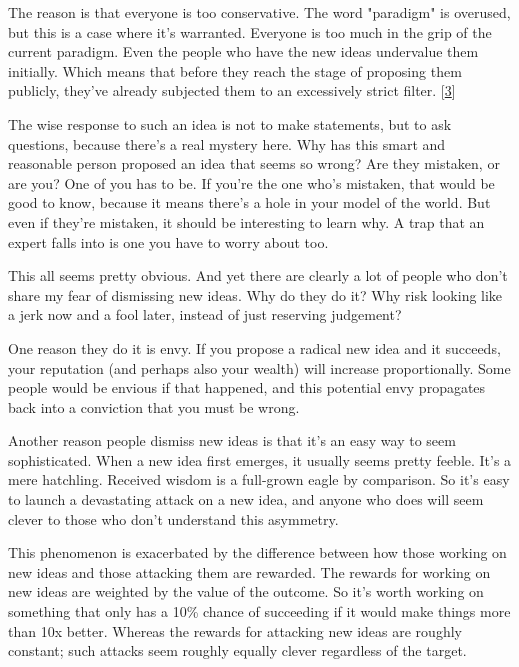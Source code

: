 The reason is that
                  everyone is too conservative. The word "paradigm" is overused,
                  but this is a case where it's warranted. Everyone is too much
                  in the grip of the current paradigm. Even the people who have
                  the new ideas undervalue them initially. Which means that
                  before they reach the stage of proposing them publicly,
                  they've already subjected them to an excessively strict
                  filter.
                  [\href{\#f3n}{3}]

The wise response to such an idea is not to make
                  statements, but to ask questions, because there's a real
                  mystery here. Why has this smart and reasonable person
                  proposed an idea that seems so wrong? Are they mistaken, or
                  are you? One of you has to be. If you're the one who's
                  mistaken, that would be good to know, because it means there's
                  a hole in your model of the world. But even if they're
                  mistaken, it should be interesting to learn why. A trap that
                  an expert falls into is one you have to worry about too.

This
                  all seems pretty obvious. And yet there are clearly a lot of
                  people who don't share my fear of dismissing new ideas. Why do
                  they do it? Why risk looking like a jerk now and a fool later,
                  instead of just reserving judgement?

One reason
                  they do it is envy. If you propose a radical new idea and it
                  succeeds, your reputation (and perhaps also your wealth) will
                  increase proportionally. Some people would be envious if that
                  happened, and this potential envy propagates back into a
                  conviction that you must be wrong.

Another reason
                  people dismiss new ideas is that it's an easy way to seem
                  sophisticated. When a new idea first emerges, it usually seems
                  pretty feeble. It's a mere hatchling. Received wisdom is a
                  full-grown eagle by comparison. So it's easy to launch a
                  devastating attack on a new idea, and anyone who does will
                  seem clever to those who don't understand this asymmetry.

This
                  phenomenon is exacerbated by the difference between how those
                  working on new ideas and those attacking them are rewarded.
                  The rewards for working on new ideas are weighted by the value
                  of the outcome. So it's worth working on something that only
                  has a 10\% chance of succeeding if it would make things more
                  than 10x better. Whereas the rewards for attacking new ideas
                  are roughly constant; such attacks seem roughly equally clever
                  regardless of the target.

